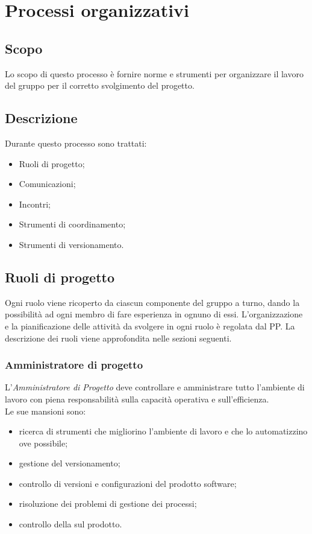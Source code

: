 \documentclass[../NormediProgetto.tex]{subfiles}
\begin{document}
	
	\chapter{Processi organizzativi}
	
	\section{Scopo}
	Lo scopo di questo processo è fornire norme e strumenti per organizzare il lavoro del gruppo per il corretto svolgimento del progetto.
	
	\section {Descrizione}
	Durante questo processo sono trattati:
	\begin{itemize}
		\item Ruoli di progetto;
		\item Comunicazioni;
		\item Incontri;
		\item Strumenti di coordinamento;
		\item Strumenti di versionamento.
		
	\end{itemize}
	
	\section {Ruoli di progetto}
	
	Ogni ruolo viene ricoperto da ciascun componente del gruppo a turno, dando la possibilità ad ogni membro di fare esperienza in ognuno di essi. L'organizzazione e la pianificazione delle attività da svolgere in ogni ruolo è regolata dal PP. La descrizione dei ruoli viene approfondita nelle sezioni seguenti.
	
	\subsection {Amministratore di progetto}
	
	L’\textit{Amministratore di Progetto} deve controllare e amministrare tutto l’ambiente di lavoro con piena responsabilità sulla capacità operativa e sull’efficienza. 
	\\ \noindent Le sue mansioni sono: 
	
	\begin{itemize}
		\item ricerca di strumenti che migliorino l’ambiente di lavoro e che lo automatizzino ove possibile;
		\item gestione del versionamento;
		\item controllo di versioni e configurazioni del prodotto software; 
		\item risoluzione dei problemi di gestione dei processi; 
		\item controllo della  sul prodotto.
	\end{itemize}
	
\end{document}
